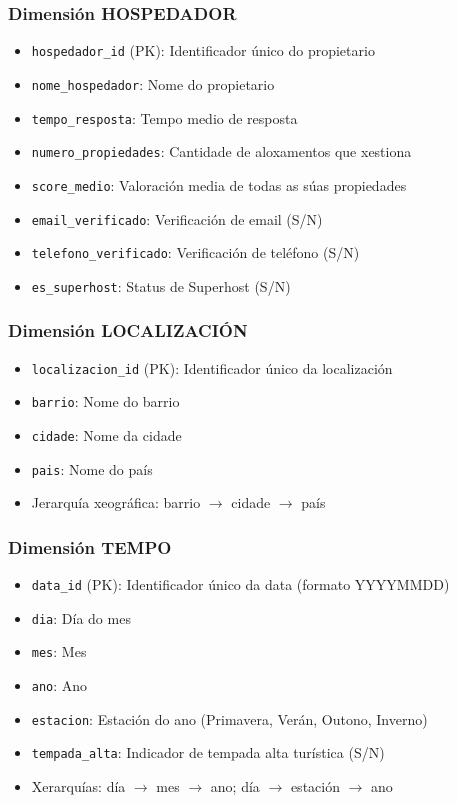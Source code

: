 \documentclass[12pt,a4paper]{article}
\begin{document}
\subsubsection{Dimensión HOSPEDADOR}
\begin{itemize}
    \item \texttt{hospedador\_id} (PK): Identificador único do propietario
    \item \texttt{nome\_hospedador}: Nome do propietario
    \item \texttt{tempo\_resposta}: Tempo medio de resposta
    \item \texttt{numero\_propiedades}: Cantidade de aloxamentos que xestiona
    \item \texttt{score\_medio}: Valoración media de todas as súas propiedades
    \item \texttt{email\_verificado}: Verificación de email (S/N)
    \item \texttt{telefono\_verificado}: Verificación de teléfono (S/N)
    \item \texttt{es\_superhost}: Status de Superhost (S/N)
\end{itemize}

\subsubsection{Dimensión LOCALIZACIÓN}
\begin{itemize}
    \item \texttt{localizacion\_id} (PK): Identificador único da localización
    \item \texttt{barrio}: Nome do barrio
    \item \texttt{cidade}: Nome da cidade  
    \item \texttt{pais}: Nome do país
    \item Jerarquía xeográfica: barrio $\rightarrow$ cidade $\rightarrow$ país
\end{itemize}

\subsubsection{Dimensión TEMPO}
\begin{itemize}
    \item \texttt{data\_id} (PK): Identificador único da data (formato YYYYMMDD)
    \item \texttt{dia}: Día do mes
    \item \texttt{mes}: Mes
    \item \texttt{ano}: Ano
    \item \texttt{estacion}: Estación do ano (Primavera, Verán, Outono, Inverno)
    \item \texttt{tempada\_alta}: Indicador de tempada alta turística (S/N)
    \item Xerarquías: día $\rightarrow$ mes $\rightarrow$ ano; día $\rightarrow$ estación $\rightarrow$ ano
\end{itemize}
\end{document}
